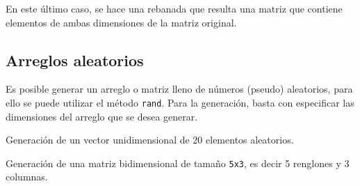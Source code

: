 En este último caso, se hace una rebanada que resulta una matriz que
contiene elementos de ambas dimensiones de la matriz original.

\begin{Shaded}
\begin{Highlighting}[]
\OperatorTok{=}\NormalTok{ np.array([[}\NormalTok{, }\NormalTok{, }\NormalTok{, }\NormalTok{, }\NormalTok{], [}\NormalTok{, }\NormalTok{, }\NormalTok{, }\NormalTok{, }\NormalTok{]])}
    \NormalTok{(arreglo[}\NormalTok{:}\NormalTok{, }\NormalTok{:}\NormalTok{])}
\end{Highlighting}
\end{Shaded}

\subsection{Arreglos aleatorios}

Es posible generar un arreglo o matriz lleno de números (pseudo)
aleatorios, para ello se puede utilizar el método \texttt{rand}. Para la
generación, basta con especificar las dimensiones del arreglo que se
desea generar.\\


\begin{code} Generación de un vector unidimensional de 20 elementos aleatorios.

\begin{Shaded}
\begin{Highlighting}[]
\OperatorTok{=}\NormalTok{) }

\end{Highlighting}
\end{Shaded}
\end{code}

\begin{code} Generación de una matriz bidimensional de tamaño \texttt{5x3}, es decir 5 renglones y 3 columnas.

\begin{Shaded}
\begin{Highlighting}[]
\OperatorTok{=}\NormalTok{, }\NormalTok{) }

\end{Highlighting}
\end{Shaded}
\end{code}

